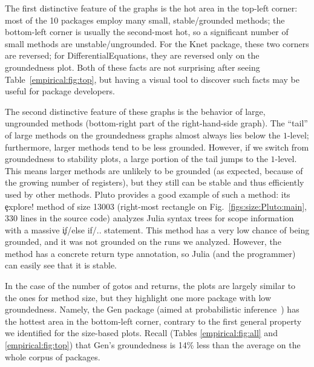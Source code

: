 The first distinctive feature of the graphs is the hot area in the top-left
corner: most of the 10 packages employ many small, stable/grounded methods;
the bottom-left corner is usually the second-most hot, so a significant number
of small methods are unstable/ungrounded. For the Knet package,
these two corners are reversed; for DifferentialEquations, they are reversed
only on the groundedness plot. Both of these facts are not surprising after seeing
Table~\ref{empirical:fig:top}, but having a visual tool to discover such facts
may be useful for package developers.

The second distinctive feature of these graphs is the behavior of large,
ungrounded methods (bottom-right part of the right-hand-side graph). The
``tail'' of large methods on the groundedness graphs almost always lies below
the $1$-level; furthermore, larger methods tend to be less grounded.
However, if we switch from groundedness to stability plots, a large portion of
the tail jumps to the $1$-level. This means larger methods are unlikely to be
grounded (as expected, because of the growing number of registers), but they
still can be stable and thus efficiently used by other methods. Pluto provides a
good example of such a method: its \c{explore!} method of size 13003 (right-most
rectangle on Fig.~\ref{figs:size:Pluto:main}, 330 lines in the source code) analyzes
Julia syntax trees for scope information with a massive \c{if/else if/..} statement.
This method has a very low chance of being grounded, and it was not grounded on the
runs we analyzed. However, the method has a concrete return type annotation, so
Julia (and the programmer) can easily see that it is stable.


In the case of the number of gotos and returns, the plots are largely similar
to the ones for method size, but they highlight one more package with low
groundedness. Namely, the Gen package (aimed at probabilistic
inference~\cite{JuliaGenPkgPub2019}) has the hottest area in the bottom-left
corner, contrary to the first general property we identified for the size-based
plots. Recall (Tables \ref{empirical:fig:all} and \ref{empirical:fig:top}) that
Gen's groundedness is 14\% less than the average on the whole corpus of
\goodpkgsnum packages.

